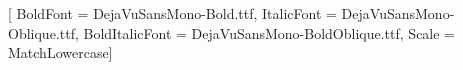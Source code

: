 
\usepackage{graphicx}

\usepackage{booktabs}
\usepackage{microtype}

%
\setmonofont{DejaVuSansMono.ttf}[
  BoldFont       = DejaVuSansMono-Bold.ttf,
  ItalicFont     = DejaVuSansMono-Oblique.ttf,
  BoldItalicFont = DejaVuSansMono-BoldOblique.ttf,
  Scale          = MatchLowercase]

\usepackage{newunicodechar}

